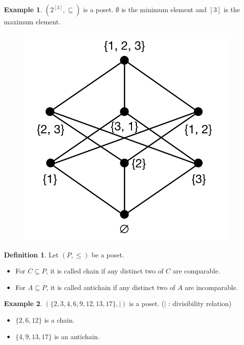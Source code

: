 \documentclass[11pt]{article}
\theoremstyle{definition}
\newtheorem{definition}{Definition}
\newtheorem{example}{Example}
\begin{document}
	\begin{example}
		$(2^{[3]}, \subseteq)$ is a poset.
		$\emptyset$ is the minimum element and $[3]$ is the maximum element.
		\begin{figure}[H]
			\begin{center}
				\includegraphics[scale= 0.35]{Fig00.png}
			\end{center}
		\end{figure}
	\end{example}
	
	\begin{definition}
		Let $(P, \leq)$ be a poset. 
		\begin{itemize}
			\item For $C \subseteq P$, it is called chain if any distinct two of $C$ are comparable.
			\item For $A \subseteq P$, it is called antichain if any distinct two of $A$ are incomparable.
		\end{itemize}
	\end{definition}
	
	\begin{example}
		$(\{2, 3, 4, 6, 9, 12, 13, 17\}, |)$ is a poset. \hfill($|$ : divisibility relation)
		\begin{itemize}
			\item $\{2, 6, 12\}$ is a chain.
			\item $\{4, 9, 13, 17\}$ is an antichain.
		\end{itemize}
	\end{example}
	
\end{document}

